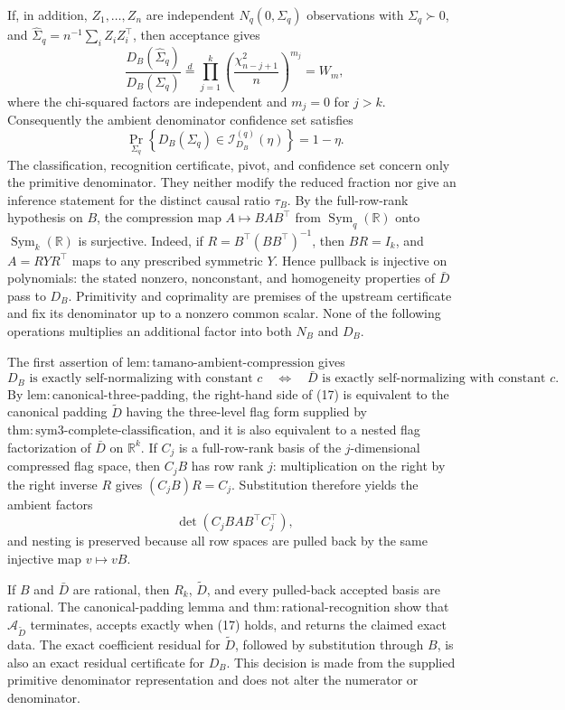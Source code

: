 If, in addition, \(Z_1,\ldots,Z_n\) are independent
\(N_q(0,\Sigma_q)\) observations with \(\Sigma_q\succ0\), and
\(\widehat\Sigma_q=n^{-1}\sum_iZ_iZ_i^{\top}\), then acceptance gives
\[
 \frac{D_B(\widehat\Sigma_q)}{D_B(\Sigma_q)}
 \stackrel{d}{=}
 \prod_{j=1}^{k}
 \left(\frac{\chi^2_{n-j+1}}{n}\right)^{m_j}
 =W_m,
\]
where the chi-squared factors are independent and \(m_j=0\) for
\(j>k\).  Consequently the ambient denominator confidence set satisfies
\[
 \Pr_{\Sigma_q}\!\left\{D_B(\Sigma_q)
 \in\mathcal I_{D_B}^{(q)}(\eta)\right\}=1-\eta.
\]
The classification, recognition certificate, pivot, and confidence set
concern only the primitive denominator.  They neither modify the reduced
fraction nor give an inference statement for the distinct causal ratio
\(\tau_B\).
By the full-row-rank hypothesis on \(B\), the compression map
\(A\mapsto BAB^{\top}\) from
\(\operatorname{Sym}_q(\mathbb R)\) onto
\(\operatorname{Sym}_k(\mathbb R)\) is surjective.  Indeed, if
\(R=B^{\top}(BB^{\top})^{-1}\), then \(BR=I_k\), and
\(A=RYR^{\top}\) maps to any prescribed symmetric \(Y\).  Hence
pullback is injective on polynomials: the stated nonzero, nonconstant,
and homogeneity properties of \(\bar D\) pass to \(D_B\).
Primitivity and coprimality are premises of the upstream certificate and
fix its denominator up to a nonzero common scalar.  None of the following
operations multiplies an additional factor into both \(N_B\) and
\(D_B\).

The first assertion of
\(\mathrm{lem{:}tamano\text{-}ambient\text{-}compression}\) gives
\[
 D_B\text{ is exactly self-normalizing with constant }c
 \quad\Longleftrightarrow\quad
 \bar D\text{ is exactly self-normalizing with constant }c.          \tag{17}
\]
By \(\mathrm{lem{:}canonical\text{-}three\text{-}padding}\), the
right-hand side of (17) is equivalent to the canonical padding
\(\widetilde D\) having the three-level flag form supplied by
\(\mathrm{thm{:}sym3\text{-}complete\text{-}classification}\), and it
is also equivalent to a nested flag factorization of \(\bar D\) on
\(\mathbb R^k\).  If \(C_j\) is a full-row-rank basis of the
\(j\)-dimensional compressed flag space, then \(C_jB\) has row rank
\(j\): multiplication on the right by the right inverse \(R\) gives
\((C_jB)R=C_j\).  Substitution therefore yields the ambient factors
\[
 \det\!\left(C_jB A B^{\top}C_j^{\top}\right),
\]
and nesting is preserved because all row spaces are pulled back by the
same injective map \(v\mapsto vB\).

If \(B\) and \(\bar D\) are rational, then \(R_k\),
\(\widetilde D\), and every pulled-back accepted basis are rational.
The canonical-padding lemma and
\(\mathrm{thm{:}rational\text{-}recognition}\) show that
\(\mathcal A_{\widetilde D}\) terminates, accepts exactly when (17)
holds, and returns the claimed exact data.  The exact coefficient
residual for \(\widetilde D\), followed by substitution through \(B\),
is also an exact residual certificate for \(D_B\).  This decision is
made from the supplied primitive denominator representation and does
not alter the numerator or denominator.

